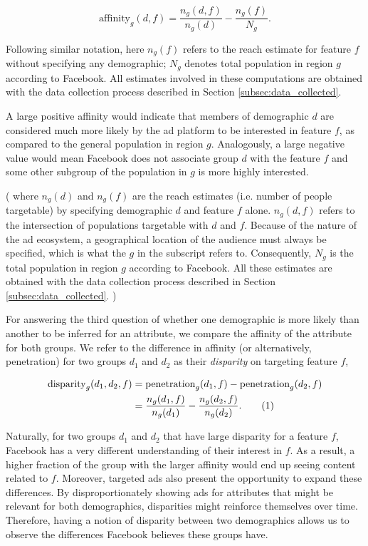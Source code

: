 \begin{equation}
\text{affinity}_g(d, f) = \frac{n_g(d, f)}{n_g(d)} - \frac{n_g(f)}{N_g}.
\label{eq:aff}
\end{equation}

Following similar notation, here $n_g(f)$ refers to the reach estimate for feature $f$ without specifying any demographic; $N_g$ denotes total population in region $g$ according to Facebook. All estimates involved in these computations are obtained with the data collection process described in Section \ref{subsec:data_collected}.

A large positive affinity would indicate that members of demographic $d$ are considered much more likely by the ad platform to be interested in feature $f$, as compared to the general population in region $g$. Analogously, a large negative value would mean Facebook does not associate group $d$ with the feature $f$ and some other subgroup of the population in $g$ is more highly interested.

\if(
where $n_g(d)$ and $n_g(f)$ are the reach estimates (i.e. number of people targetable) by specifying demographic $d$ and feature $f$ alone. $n_g(d, f)$ refers to the intersection of populations targetable with $d$ and $f$. Because of the nature of the ad ecosystem, a geographical location of the audience must always be specified, which is what the $g$ in the subscript refers to. Consequently, $N_g$ is the total population in region $g$ according to Facebook. All these estimates are obtained with the data collection process described in Section \ref{subsec:data_collected}.
)\fi

For answering the third question of whether one demographic is more likely than another to be inferred for an attribute, we compare the affinity of the attribute for both groups. We refer to the difference in affinity (or alternatively, penetration) for two groups $d_1$ and $d_2$ as their \textit{disparity} on targeting feature $f$,

\begin{align*}
\text{disparity}_g(d_1, d_2, f) &= \text{penetration}_g(d_1, f) - \text{penetration}_g(d_2, f)\\
&= \frac{n_g(d_1, f)}{n_g(d_1)} - \frac{n_g(d_2, f)}{n_g(d_2)}. \addtocounter{equation}{1}\tag{\theequation}
\label{eq:disparity}
\end{align*}

Naturally, for two groups $d_1$ and $d_2$ that have large disparity for a feature $f$, Facebook has a very different understanding of their interest in $f$. As a result, a higher fraction of the group with the larger affinity would end up seeing content related to $f$. Moreover, targeted ads also present the opportunity to expand these differences. By disproportionately showing ads for attributes that might be relevant for both demographics, disparities might reinforce themselves over time. Therefore, having a notion of disparity between two demographics allows us to observe the differences Facebook believes these groups have.


